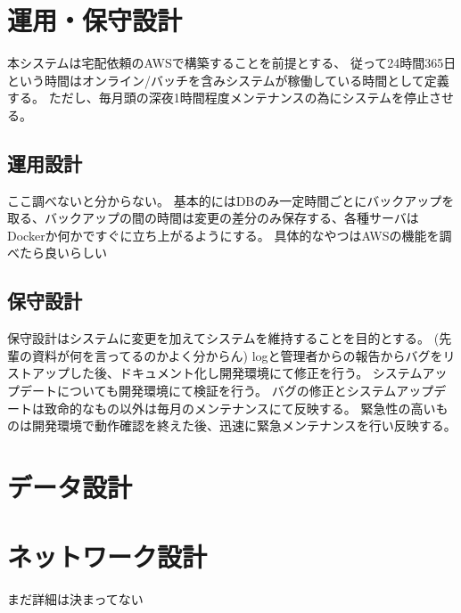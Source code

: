 \documentclass[a4paper, titlepage]{jsarticle}
\begin{document}
\section{運用・保守設計}
本システムは宅配依頼のAWSで構築することを前提とする、
従って24時間365日という時間はオンライン/バッチを含みシステムが稼働している時間として定義する。
ただし、毎月頭の深夜1時間程度メンテナンスの為にシステムを停止させる。
\subsection{運用設計}
ここ調べないと分からない。
基本的にはDBのみ一定時間ごとにバックアップを取る、バックアップの間の時間は変更の差分のみ保存する、各種サーバはDockerか何かですぐに立ち上がるようにする。
具体的なやつはAWSの機能を調べたら良いらしい

\subsection{保守設計}
保守設計はシステムに変更を加えてシステムを維持することを目的とする。
(先輩の資料が何を言ってるのかよく分からん)
logと管理者からの報告からバグをリストアップした後、ドキュメント化し開発環境にて修正を行う。
システムアップデートについても開発環境にて検証を行う。
バグの修正とシステムアップデートは致命的なもの以外は毎月のメンテナンスにて反映する。
緊急性の高いものは開発環境で動作確認を終えた後、迅速に緊急メンテナンスを行い反映する。
\section{データ設計}

\section{ネットワーク設計}
まだ詳細は決まってない



\end{document}
